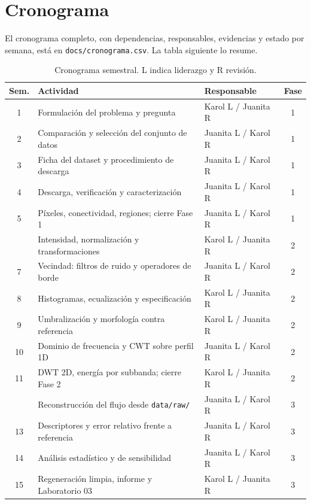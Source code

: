 \documentclass[12pt,a4paper]{article}
\begin{document}
\section{Cronograma}

El cronograma completo, con dependencias, responsables, evidencias y estado por
semana, está en \texttt{docs/cronograma.csv}. La tabla siguiente lo resume.

\begin{table}[H]
\centering
\caption{Cronograma semestral. L indica liderazgo y R revisión.}
\small
\begin{tabular}{@{}cp{6.4cm}p{3.3cm}c@{}}
\toprule
\textbf{Sem.} & \textbf{Actividad} & \textbf{Responsable} & \textbf{Fase} \\
\midrule
1  & Formulación del problema y pregunta & Karol L / Juanita R & 1 \\
2  & Comparación y selección del conjunto de datos & Juanita L / Karol R & 1 \\
3  & Ficha del dataset y procedimiento de descarga & Juanita L / Karol R & 1 \\
4  & Descarga, verificación y caracterización & Juanita L / Karol R & 1 \\
5  & Píxeles, conectividad, regiones; cierre Fase 1 & Juanita L / Karol R & 1 \\
\addlinespace
6  & Intensidad, normalización y transformaciones & Karol L / Juanita R & 2 \\
7  & Vecindad: filtros de ruido y operadores de borde & Juanita L / Karol R & 2 \\
8  & Histogramas, ecualización y especificación & Karol L / Juanita R & 2 \\
9  & Umbralización y morfología contra referencia & Karol L / Juanita R & 2 \\
10 & Dominio de frecuencia y CWT sobre perfil 1D & Juanita L / Karol R & 2 \\
11 & DWT 2D, energía por subbanda; cierre Fase 2 & Karol L / Juanita R & 2 \\
\addlinespace
12 & Reconstrucción del flujo desde \texttt{data/raw/} & Juanita L / Karol R & 3 \\
13 & Descriptores y error relativo frente a referencia & Juanita L / Karol R & 3 \\
14 & Análisis estadístico y de sensibilidad & Juanita L / Karol R & 3 \\
15 & Regeneración limpia, informe y Laboratorio 03 & Karol L / Juanita R & 3 \\
\bottomrule
\end{tabular}
\end{table}
\end{document}
